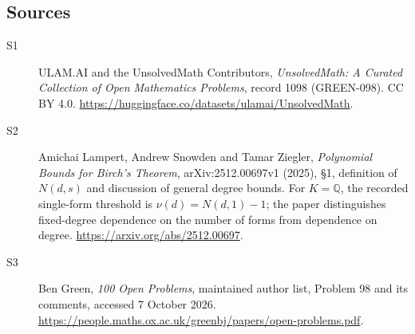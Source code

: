 \documentclass[11pt]{article}
\begin{document}
\subsection{Sources}
\begin{description}
\item[\hypertarget{source:1098:1}{S1}] ULAM.AI and the UnsolvedMath Contributors, \emph{UnsolvedMath: A Curated Collection of Open Mathematics Problems}, record 1098 (GREEN-098). CC BY 4.0. \url{https://huggingface.co/datasets/ulamai/UnsolvedMath}.
\item[\hypertarget{source:1098:2}{S2}] Amichai Lampert, Andrew Snowden and Tamar Ziegler, \emph{Polynomial Bounds for Birch’s Theorem}, arXiv:2512.00697v1 (2025), §1, definition of $N(d,s)$ and discussion of general degree bounds. For $K=\mathbb Q$, the recorded single-form threshold is $\nu(d)=N(d,1)-1$; the paper distinguishes fixed-degree dependence on the number of forms from dependence on degree. \url{https://arxiv.org/abs/2512.00697}.
\item[\hypertarget{source:1098:3}{S3}] Ben Green, \emph{100 Open Problems}, maintained author list, Problem 98 and its comments, accessed 7 October 2026. \url{https://people.maths.ox.ac.uk/greenbj/papers/open-problems.pdf}.
\end{description}
\label{end:1098}
\end{document}
